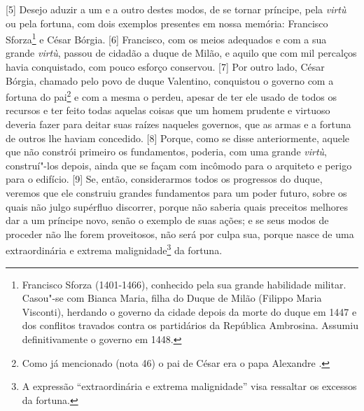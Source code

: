 {[}5{]} Desejo aduzir a um e a outro destes modos, de se tornar
príncipe, pela \emph{virtù} ou pela fortuna, com dois exemplos presentes
em nossa memória: Francisco Sforza\footnote{Francisco Sforza
  (1401-1466), conhecido pela sua grande habilidade militar. Casou"-se
  com Bianca Maria, filha do Duque de Milão (Filippo Maria Visconti), herdando o
  governo da cidade depois da morte do duque em 1447 e dos conflitos
  travados contra os partidários da República Ambrosina. Assumiu
  definitivamente o governo em 1448.} e César Bórgia. {[}6{]} Francisco,
com os meios adequados e com a sua grande \emph{virtù}, passou de
cidadão a duque de Milão, e aquilo que com mil percalços havia
conquistado, com pouco esforço conservou. {[}7{]} Por outro lado, César
Bórgia, chamado pelo povo de duque Valentino, conquistou o governo com a
fortuna do pai\footnote{Como já mencionado (nota 46) o pai de César era
  o papa Alexandre .} e com a mesma o perdeu, apesar de ter ele usado
de todos os recursos e ter feito todas aquelas coisas que um homem
prudente e virtuoso deveria fazer para deitar suas raízes naqueles
governos, que as armas e a fortuna de outros lhe haviam concedido.
{[}8{]} Porque, como se disse anteriormente, aquele que não constrói
primeiro os fundamentos, poderia, com uma grande \emph{virtù},
construí"-los depois, ainda que se façam com incômodo para o arquiteto e
perigo para o edifício. {[}9{]} Se, então, considerarmos todos os
progressos do duque, veremos que ele construiu grandes fundamentos para
um poder futuro, sobre os quais não julgo supérfluo discorrer, porque
não saberia quais preceitos melhores dar a um príncipe novo, senão o
exemplo de suas ações; e se seus modos de proceder não lhe forem
proveitosos, não será por culpa sua, porque nasce de uma extraordinária
e extrema malignidade\footnote{A expressão ``extraordinária e extrema
  malignidade'' visa ressaltar os excessos da fortuna.} da fortuna.

